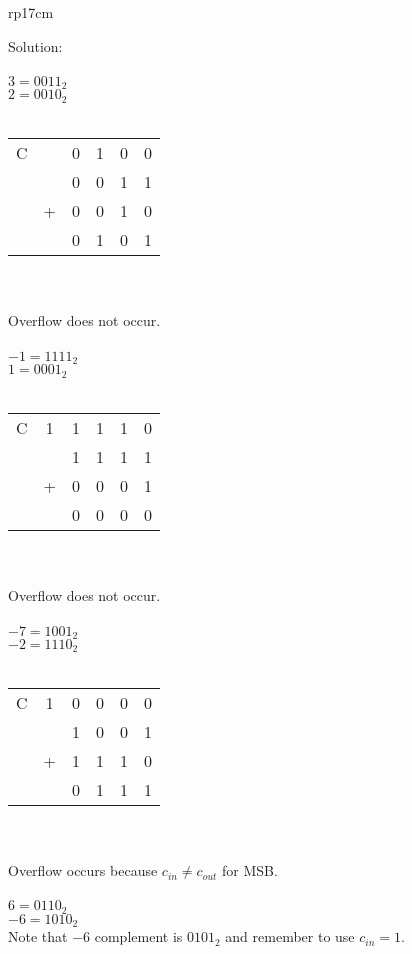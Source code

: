\documentclass{article}
\begin{document}
\begin{longtable}[l]{rp{17cm}}
\begin{minipage}[t]{\linewidth}
Solution: \\
\\
$3 = 0011_2$\\
$2 = 0010_2$\\
\\
\begin{tabular}{cccccc}
  C &   & 0 & 1 & 0 & 0 \\
    &   & 0 & 0 & 1 & 1 \\
    & + & 0 & 0 & 1 & 0 \\
  \hline
    &   & 0 & 1 & 0 & 1 \\
\end{tabular} \\
\\
Overflow does not occur.\\
\\
$-1 = 1111_2$\\
$1 = 0001_2$\\
\\
\begin{tabular}{cccccc}
  C & 1 & 1 & 1 & 1 & 0 \\
    &   & 1 & 1 & 1 & 1 \\
    & + & 0 & 0 & 0 & 1 \\
  \hline
    &   & 0 & 0 & 0 & 0 \\
\end{tabular} \\
\\
Overflow does not occur.\\
\\
$-7 = 1001_2$\\
$-2 = 1110_2$\\
\\
\begin{tabular}{cccccc}
  C & 1 & 0 & 0 & 0 & 0 \\
    &   & 1 & 0 & 0 & 1 \\
    & + & 1 & 1 & 1 & 0 \\
  \hline
    &   & 0 & 1 & 1 & 1 \\
\end{tabular} \\
\\
Overflow occurs because $c_{in} \neq c_{out}$ for MSB.\\
\\
$6 = 0110_2$\\
$-6 = 1010_2$\\
Note that $-6$ complement is $0101_2$ and remember to use $c_{in}=1$.\\
\\

\end{minipage}
\end{longtable}
\end{document}
